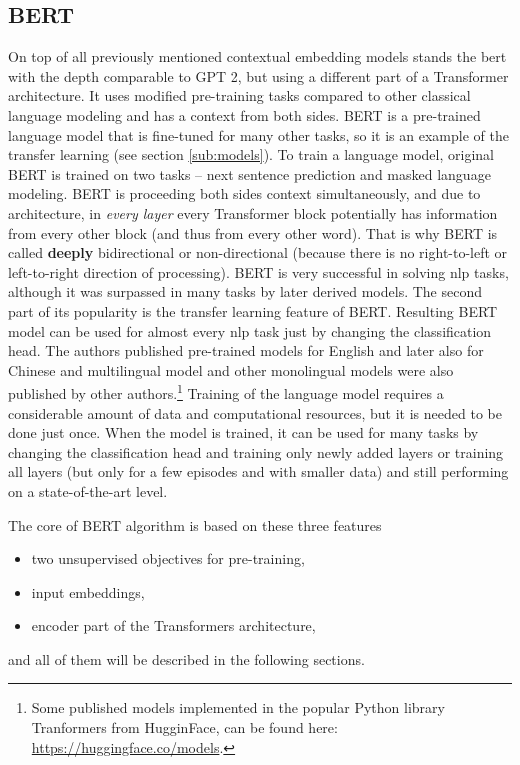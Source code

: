 \subsection{BERT}
On top of all previously mentioned contextual embedding models stands the \acrfull{bert} \citep{Devlin2019} with the depth comparable to GPT 2, but using a different part of a Transformer architecture. It uses modified pre-training tasks compared to other classical language modeling and has a context from both sides. BERT is a pre-trained language model that is fine-tuned for many other tasks, so it is an example of the transfer learning (see section \ref{sub:models}).
To train a language model, original BERT is trained on two tasks -- next sentence prediction and masked language modeling. BERT is proceeding both sides context simultaneously, and due to architecture, in \textit{every layer} every Transformer block potentially has information from every other block (and thus from every other word). That is why BERT is called \textbf{deeply} bidirectional or non-directional (because there is no right-to-left or left-to-right direction of processing). BERT is very successful in solving \acrshort{nlp} tasks, although it was surpassed in many tasks by later derived models. 
The second part of its popularity is the transfer learning feature of BERT. Resulting BERT model can be used for almost every \acrshort{nlp} task just by changing the classification head. The authors published pre-trained models for English and later also for Chinese and multilingual model and other monolingual models were also published by other authors.\footnote{Some published models implemented in the popular Python library Tranformers from HugginFace, can be found here: \url{https://huggingface.co/models}.} Training of the language model requires a considerable amount of data and computational resources, but it is needed to be done just once. When the model is trained, it can be used for many tasks by changing the classification head and training only newly added layers or training all layers (but only for a few episodes and with smaller data) and still performing on a state-of-the-art level. 
\par
The core of BERT algorithm is based on these three features
\begin{itemize}
\item two unsupervised objectives for pre-training,
\item input embeddings,
\item encoder part of the Transformers architecture,
\end{itemize}
and all of them will be described in the following sections.
